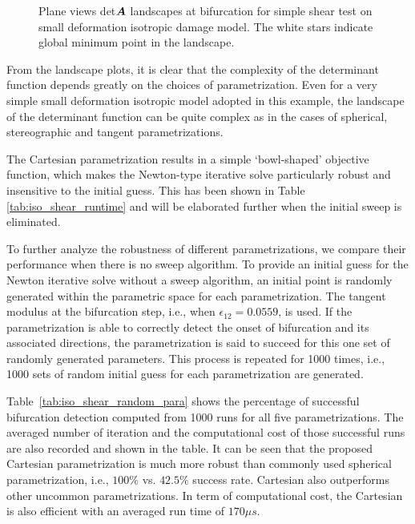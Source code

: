 \documentclass[12pt]{article}
\numberwithin{equation}{section}
\begin{document}
\begin{figure}[H]
{ } 
   \caption{Plane views det${\boldsymbol{A}}$ landscapes at bifurcation
   for simple shear test on small deformation isotropic damage model. 
   The white stars indicate global minimum point in the landscape.}
   \label{fig:iso_shear_detAXplane}
 \end{figure}

From the landscape plots, it is clear that the complexity of the 
determinant function depends greatly on the choices of 
parametrization. Even for a very simple small deformation isotropic 
model adopted in this example, the landscape of the determinant 
function can be quite complex as in the cases of spherical, 
stereographic and tangent parametrizations. 

The Cartesian parametrization results in a simple `bowl-shaped' 
objective function, which makes the Newton-type iterative solve 
particularly robust and insensitive to the initial guess. This has 
been shown in Table \ref{tab:iso_shear_runtime} and will be 
elaborated further when the initial sweep is eliminated. 

To further analyze the robustness of different parametrizations, we 
compare their performance when there is no sweep algorithm. To provide 
an initial guess for the Newton iterative solve without a sweep 
algorithm, an initial point is randomly generated within the 
parametric space for each parametrization. The tangent modulus at the 
bifurcation step, i.e., when $\epsilon_{12}=0.0559$, is used. If the 
parametrization is able to correctly detect the onset of bifurcation 
and its associated directions, the parametrization is said to succeed 
for this one set of randomly generated parameters. This process is 
repeated for 1000 times, i.e., 1000 sets of random initial guess for 
each parametrization are generated.

Table~\ref{tab:iso_shear_random_para} shows the percentage of 
successful bifurcation detection computed from 1000 runs for all five 
parametrizations. The averaged number of iteration and the 
computational cost of those successful runs are also recorded and 
shown in the table. It can be seen that the proposed Cartesian 
parametrization is much more robust than commonly used spherical 
parametrization, i.e., $100\%$ vs. $42.5\%$ success rate. Cartesian 
also outperforms other uncommon parametrizations. In term of 
computational cost, the Cartesian is also efficient with an averaged 
run time of $170\mu s$.
\end{document}
